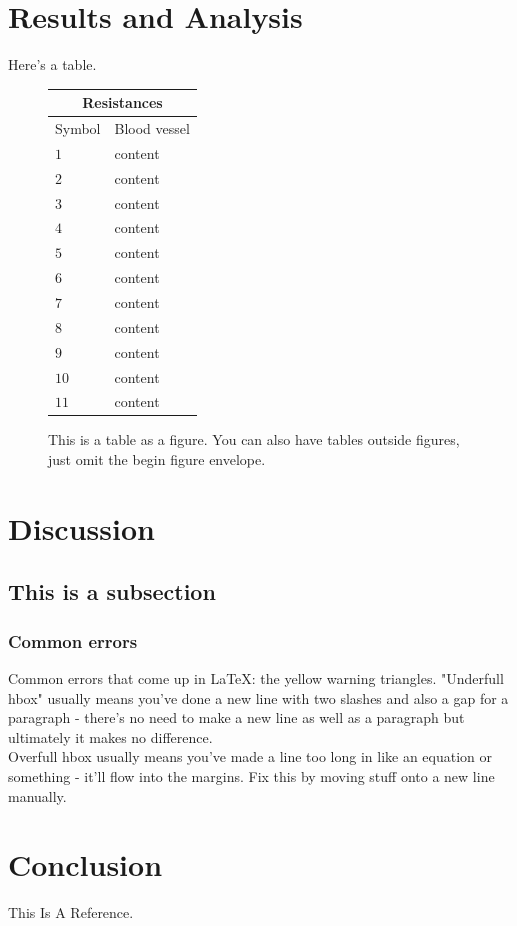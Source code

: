 \documentclass{article}
\begin{document}
\section{Results and Analysis}
Here's a table.
\begin{figure}[h]
    \centering
    \begin{tabular}{|p{2cm}|p{6cm}|}
    \hline
    \multicolumn{2}{|c|}{\textbf{Resistances}}\\
    \hline
    Symbol & Blood vessel \\
    \hline
    $ 1 $ & content \\
    $ 2 $ & content \\
    $ 3 $ &  content \\
    $ 4 $ & content \\
    $ 5 $ & content \\
    $ 6 $ & content \\
    $ 7 $ & content \\
    $ 8 $ & content \\
    $ 9 $ & content \\
    $ 10 $ & content \\
    $ 11 $ & content\\
    \hline
    \end{tabular}
    \caption{This is a table as a figure. You can also have tables outside figures, just omit the begin figure envelope.}
    \label{fig:my_label}
\end{figure}

\section{Discussion}
\subsection{This is a subsection}
\subsubsection{Common errors} %
Common errors that come up in LaTeX: the yellow warning triangles. "Underfull hbox" usually means you've done a new line with two slashes and also a gap for a paragraph - there's no need to make a new line as well as a paragraph but ultimately it makes no difference.\\ %
Overfull hbox usually means you've made a line too long in like an equation or something - it'll flow into the margins. Fix this by moving stuff onto a new line manually.


\section{Conclusion}

\begin{thebibliography}{9}
This Is A Reference.

\end{thebibliography}
\end{document}
